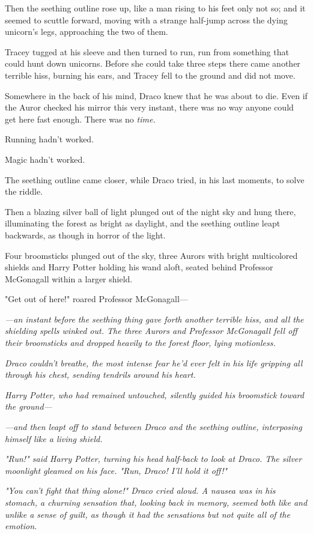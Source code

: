 Then the seething outline rose up, like a man rising to his feet only not so; and it seemed to scuttle forward, moving with a strange half-jump across the dying unicorn's legs, approaching the two of them.

Tracey tugged at his sleeve and then turned to run, run from something that could hunt down unicorns. Before she could take three steps there came another terrible hiss, burning his ears, and Tracey fell to the ground and did not move.

Somewhere in the back of his mind, Draco knew that he was about to die. Even if the Auror checked his mirror this very instant, there was no way anyone could get here fast enough. There was no \emph{time.}

Running hadn't worked.

Magic hadn't worked.

The seething outline came closer, while Draco tried, in his last moments, to solve the riddle.

Then a blazing silver ball of light plunged out of the night sky and hung there, illuminating the forest as bright as daylight, and the seething outline leapt backwards, as though in horror of the light.

Four broomsticks plunged out of the sky, three Aurors with bright multicolored shields and Harry Potter holding his wand aloft, seated behind Professor McGonagall within a larger shield.

"Get out of here!" roared Professor McGonagall---

\emph{---an instant before the seething thing gave forth another terrible hiss, and all the shielding spells winked out. The three Aurors and Professor McGonagall fell off their broomsticks and dropped heavily to the forest floor, lying motionless.}

\emph{Draco couldn't breathe, the most intense fear he'd ever felt in his life gripping all through his chest, sending tendrils around his heart.}

\emph{Harry Potter, who had remained untouched, silently guided his broomstick toward the ground---}

\emph{---and then leapt off to stand between Draco and the seething outline, interposing himself like a living shield.}

\emph{"Run!" said Harry Potter, turning his head half-back to look at Draco. The silver moonlight gleamed on his face. "Run, Draco! I'll hold it off!"}

\emph{"You can't fight that thing alone!" Draco cried aloud. A nausea was in his stomach, a churning sensation that, looking back in memory, seemed both like and unlike a sense of guilt, as though it had the sensations but not quite all of the emotion.}


